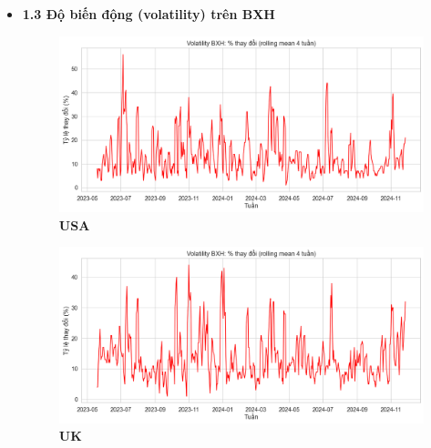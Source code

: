\begin{itemize}
\begin{itemize}
          \end{itemize}

    \item\textbf{1.3 Độ biến động (volatility) trên BXH}


    \begin{figure}[H]
        \centering
        \begin{minipage}{0.45\textwidth}
            \centering
            \includegraphics[width=\linewidth]{../graphics/data_top50/figure/12/EDA_usa.png}
            \\[4pt] {\small \textbf{USA}}
        \end{minipage}
        \hfill
        \begin{minipage}{0.45\textwidth}
            \centering
            \includegraphics[width=\linewidth]{../graphics/data_top50/figure/12/EDA_uk.png}
            \\[4pt] {\small \textbf{UK}}
        \end{minipage}

        \vspace{0.4cm}


\end{figure}
\end{itemize}
